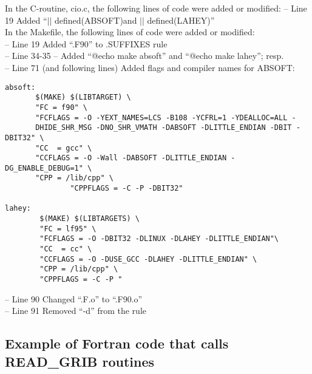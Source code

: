 In the C-routine, cio.c, the following lines of code were added or modified:
 -- Line 19   Added ``$||$ defined(ABSOFT)and $||$ defined(LAHEY)''\\

In the Makefile, the following lines of code were added or modified:\\
 -- Line 19   Added ``.F90''  to .SUFFIXES rule \\
 -- Line 34-35 --  Added ``@echo make absoft'' and ``@echo make lahey''; resp.   \\
 -- Line 71 (and following lines)  Added flags and compiler names for ABSOFT:\\

\begin{verbatim}
absoft:
       $(MAKE) $(LIBTARGET) \
       "FC = f90" \
       "FCFLAGS = -O -YEXT_NAMES=LCS -B108 -YCFRL=1 -YDEALLOC=ALL -     
       DHIDE_SHR_MSG -DNO_SHR_VMATH -DABSOFT -DLITTLE_ENDIAN -DBIT -DBIT32" \
       "CC  = gcc" \
       "CCFLAGS = -O -Wall -DABSOFT -DLITTLE_ENDIAN -DG_ENABLE_DEBUG=1" \
       "CPP = /lib/cpp" \
               "CPPFLAGS = -C -P -DBIT32"

lahey:
        $(MAKE) $(LIBTARGETS) \
        "FC = lf95" \
        "FCFLAGS = -O -DBIT32 -DLINUX -DLAHEY -DLITTLE_ENDIAN"\
        "CC  = cc" \
        "CCFLAGS = -O -DUSE_GCC -DLAHEY -DLITTLE_ENDIAN" \
        "CPP = /lib/cpp" \
        "CPPFLAGS = -C -P "

\end{verbatim}

-- Line 90   Changed ``.F.o'' to ``.F90.o''\\  

-- Line 91   Removed ``-d'' from the rule\\


\subsection{ Example of Fortran code that calls READ\_GRIB routines}

